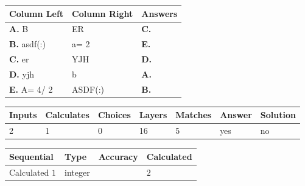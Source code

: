 \documentclass[12pt]{article}
\begin{document}
  
 
 
\noindent{}
  
  
\begin{tabular}{|l|l|l|}
 \hline
 Column Left & Column Right  & Answers       \\ 
 \hline
{\textbf{\large{
A.}}}
B
  & 
ER
 & 
{\textbf{\large{
C.}}}
 \\ 
 \hline
{\textbf{\large{
B.}}}
asdf(:)
  & 
 a= %
2
 & 
{\textbf{\large{
E.}}}
 \\ 
 \hline
{\textbf{\large{
C.}}}
er
  & 
YJH
 & 
{\textbf{\large{
D.}}}
 \\ 
 \hline
{\textbf{\large{
D.}}}
yjh
  & 
b
 & 
{\textbf{\large{
A.}}}
 \\ 
 \hline
{\textbf{\large{
E.}}}
 A= %
4/ %
2

  & 
ASDF(:)
 & 
{\textbf{\large{
B.}}}
 \\ 
 \hline
 \end{tabular}
  
  
 
 
\noindent{}
 
 
 
   
   
   
   
\noindent\begin{tabular}{|l|l|l|l|l|l|l|}
 \hline
Inputs & Calculates & Choices & Layers & Matches & Answer & Solution \\ \hline
           2 & 
           1 & 
           0
  & 
          16 & 
           5 & 
  yes & 
  no 
  \\ \hline
 \end{tabular}
   
   
   
   
\noindent{}
   
   
  
  
\noindent\begin{tabular}{|l|l|l|l|}
\hline
 Sequential & Type & Accuracy & Calculated \\ 
\hline
 
 
  Calculated $           1$ & integer &  & 
  $ 2 $ 
 \\  \hline  
 \end{tabular}
   
\end{document}
